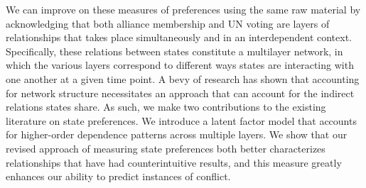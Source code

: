 We can improve on these measures of preferences using the same raw material by acknowledging that both alliance membership and UN voting are layers of relationships that takes place simultaneously and in an interdependent context. Specifically, these relations between states constitute a multilayer network, in which the various layers correspond to different ways states are interacting with one another at a given time point. A bevy of research has shown that accounting for network structure necessitates an approach that can account for the indirect relations states share. As such, we make two contributions to the existing literature on state preferences. We introduce a latent factor model that accounts for higher-order dependence patterns across multiple layers. We show that our revised approach of measuring state preferences both better characterizes relationships that have had counterintuitive results, and this measure greatly enhances our ability to predict instances of conflict.